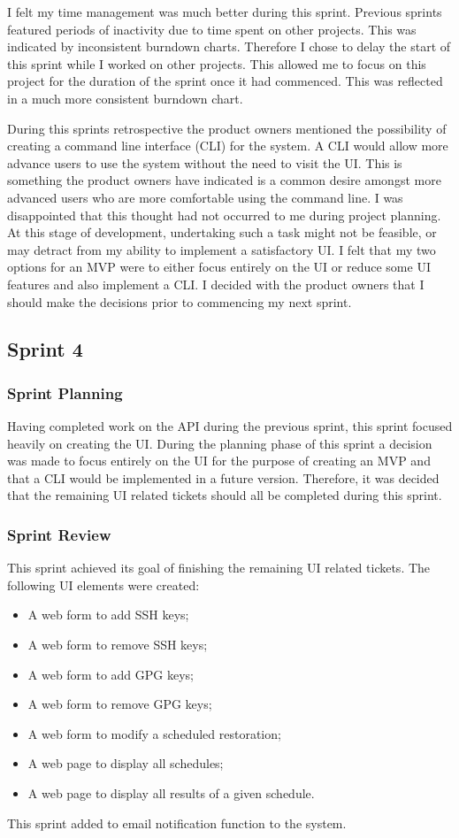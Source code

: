    I felt my time management was much better during this sprint. Previous sprints featured periods of inactivity due to time spent on other projects. This was indicated by inconsistent burndown charts. Therefore I chose to delay the start of this sprint while I worked on other projects. This allowed me to focus on this project for the duration of the sprint once it had commenced. This was reflected in a much more consistent burndown chart.
   
   During this sprints retrospective the product owners mentioned the possibility of creating a command line interface (CLI) for the system. A CLI would allow more advance users to use the system without the need to visit the UI. This is something the product owners have indicated is a common desire amongst more advanced users who are more comfortable using the command line. I was disappointed that this thought had not occurred to me during project planning. At this stage of development, undertaking such a task might not be feasible, or may detract from my ability to implement a satisfactory UI. I felt that my two options for an MVP were to either focus entirely on the UI or reduce some UI features and also implement a CLI. I decided with the product owners that I should make the decisions prior to commencing my next sprint.
   
   \subsection{Sprint 4}
   \subsubsection{Sprint Planning}
    Having completed work on the API during the previous sprint, this sprint focused heavily on creating the UI. During the planning phase of this sprint a decision was made to focus entirely on the UI for the purpose of creating an MVP and that a CLI would be implemented in a future version. Therefore, it was decided that the remaining UI related tickets should all be completed during this sprint.
   
   \subsubsection{Sprint Review}
   This sprint achieved its goal of finishing the remaining UI related tickets. The following UI elements were created:
   \begin{itemize}
     \item A web form to add SSH keys;
     \item A web form to remove SSH keys;
     \item A web form to add GPG keys;
     \item A web form to remove GPG keys;
     \item A web form to modify a scheduled restoration;
     \item A web page to display all schedules;
     \item A web page to display all results of a given schedule.
    \end{itemize}
    This sprint added to email notification function to the system.
    
